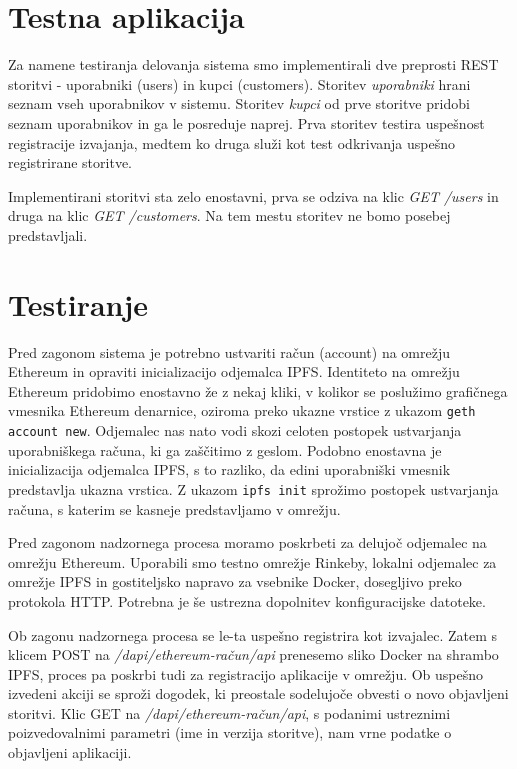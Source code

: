 \documentclass[a4paper, 12pt]{book}
\begin{document}
\section{Testna aplikacija}

Za namene testiranja delovanja sistema smo implementirali dve preprosti REST storitvi - uporabniki (users) in kupci (customers).
Storitev \textit{uporabniki} hrani seznam vseh uporabnikov v sistemu.
Storitev \textit{kupci} od prve storitve pridobi seznam uporabnikov in ga le posreduje naprej.
Prva storitev testira uspešnost registracije izvajanja, medtem ko druga služi kot test odkrivanja uspešno registrirane storitve.

Implementirani storitvi sta zelo enostavni, prva se odziva na klic \textit{GET /users} in druga na klic \textit{GET /customers}.
Na tem mestu storitev ne bomo posebej predstavljali.

\section{Testiranje}
Pred zagonom sistema je potrebno ustvariti račun (account) na omrežju Ethereum in opraviti inicializacijo odjemalca IPFS.
Identiteto na omrežju Ethereum pridobimo enostavno že z nekaj kliki, v kolikor se poslužimo grafičnega vmesnika Ethereum denarnice, oziroma preko ukazne vrstice z ukazom \texttt{geth account new}.
Odjemalec nas nato vodi skozi celoten postopek ustvarjanja uporabniškega računa, ki ga zaščitimo z geslom.
Podobno enostavna je inicializacija odjemalca IPFS, s to razliko, da edini uporabniški vmesnik predstavlja ukazna vrstica.
Z ukazom \texttt{ipfs init} sprožimo postopek ustvarjanja računa, s katerim se kasneje predstavljamo v omrežju.

Pred zagonom nadzornega procesa moramo poskrbeti za delujoč odjemalec na omrežju Ethereum. Uporabili smo testno omrežje Rinkeby, lokalni odjemalec za omrežje IPFS in gostiteljsko napravo za vsebnike Docker, dosegljivo preko protokola HTTP.
Potrebna je še ustrezna dopolnitev konfiguracijske datoteke.

Ob zagonu nadzornega procesa se le-ta uspešno registrira kot izvajalec.
Zatem s klicem POST na \textit{/dapi/{ethereum-račun}/api} prenesemo sliko Docker na shrambo IPFS, proces pa poskrbi tudi za registracijo aplikacije v omrežju.
Ob uspešno izvedeni akciji se sproži dogodek, ki preostale sodelujoče obvesti o novo objavljeni storitvi.
Klic GET na \textit{/dapi/{ethereum-račun}/api}, s podanimi ustreznimi poizvedovalnimi parametri (ime in verzija storitve), nam vrne podatke o objavljeni aplikaciji.
\end{document}
